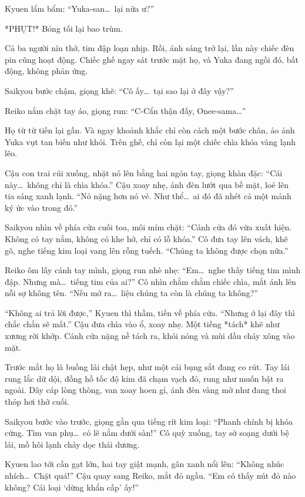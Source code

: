 \documentclass[../main.tex]{subfiles}
\begin{document}
Kyuen lẩm bẩm: ``Yuka-san\dots\ lại nữa ư?''

*PHỤT!* Bóng tối lại bao trùm.

Cả ba người nín thở, tim đập loạn nhịp. Rồi, ánh sáng trở lại, lần này chiếc đèn pin cũng hoạt động. Chiếc ghế ngay sát trước mặt họ, và Yuka đang ngồi đó, bất động, không phản ứng.

Saikyou bước chậm, giọng khẽ: ``Cô ấy\dots\ tại sao lại ở đây vậy?''

Reiko nắm chặt tay áo, giọng run: ``C-Cẩn thận đấy, Onee-sama\dots''

Họ từ từ tiến lại gần. Và ngay khoảnh khắc chỉ còn cách một bước chân, ảo ảnh Yuka vụt tan biến như khói. Trên ghế, chỉ còn lại một chiếc chìa khóa vàng lạnh lẽo.

Cậu con trai cúi xuống, nhặt nó lên bằng hai ngón tay, giọng khàn đặc: ``Cái này\dots\ không chỉ là chìa khóa.'' Cậu xoay nhẹ, ánh đèn lướt qua bề mặt, loé lên tia sáng xanh lạnh. ``Nó nặng hơn nó vẻ. Như thể\dots\ ai đó đã nhét cả một mảnh ký ức vào trong đó.''

Saikyou nhìn về phía cửa cuối toa, môi mím chặt: ``Cánh cửa đó vừa xuất hiện. Không có tay nắm, không có khe hở, chỉ có lỗ khóa.'' Cô đưa tay lên vách, khẽ gõ, nghe tiếng kim loại vang lên rỗng tuếch. ``Chúng ta không được chọn nữa.''

Reiko ôm lấy cánh tay mình, giọng run nhè nhẹ: ``Em\dots\ nghe thấy tiếng tim mình đập. Nhưng mà\dots\ tiếng tim của ai?'' Cô nhìn chằm chằm chiếc chìa, mắt ánh lên nỗi sợ không tên. ``Nếu mở ra\dots\ liệu chúng ta còn là chúng ta không?''

``Không ai trả lời được,'' Kyuen thì thầm, tiến về phía cửa. ``Nhưng ở lại đây thì chắc chắn sẽ mất.'' Cậu đưa chìa vào ổ, xoay nhẹ. Một tiếng *tách* khẽ như xương rời khớp. Cánh cửa nặng nề tách ra, khói nóng và mùi dầu cháy xông vào mặt.

Trước mắt họ là buồng lái chật hẹp, như một cái bụng sắt đang co rút. Tay lái rung lắc dữ dội, đồng hồ tốc độ kim đã chạm vạch đỏ, rung như muốn bật ra ngoài. Dây cáp lòng thòng, van xoay hoen gỉ, ánh đèn vàng mờ như đang thoi thóp hơi thở cuối.

Saikyou bước vào trước, giọng gằn qua tiếng rít kim loại: ``Phanh chính bị khóa cứng. Tìm van phụ\dots\ có lẽ nằm dưới sàn!'' Cô quỳ xuống, tay sờ soạng dưới bệ lái, mồ hôi lạnh chảy dọc thái dương.

Kyuen lao tới cần gạt lớn, hai tay giật mạnh, gân xanh nổi lên: ``Không nhúc nhích\dots\ Chặt quá!'' Cậu quay sang Reiko, mắt đỏ ngầu. ``Em có thấy nút đỏ nào không? Cái loại `dừng khẩn cấp' ấy!''
\end{document}
